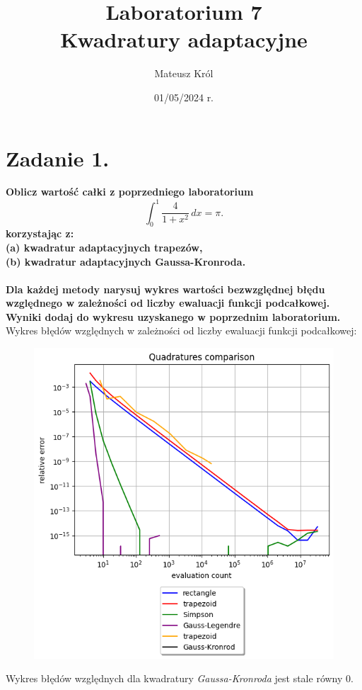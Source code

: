 \documentclass{article}
\title{%
Laboratorium 7\\
  \huge Kwadratury adaptacyjne}
\author{Mateusz Król}
\date{01/05/2024 r.}
\begin{document}
\maketitle

 
\section*{Zadanie 1.}
\textbf{Oblicz wartość całki z poprzedniego laboratorium
$$ \int_{0}^{1} \frac{4}{1+x^2} \,dx = \pi.$$
korzystając z:\\
(a) kwadratur adaptacyjnych trapezów,\\
(b) kwadratur adaptacyjnych Gaussa-Kronroda.\\\\
Dla każdej metody narysuj wykres wartości bezwzględnej błędu względnego w
zależności od liczby ewaluacji funkcji podcałkowej. Wyniki dodaj do wykresu
uzyskanego w poprzednim laboratorium.}
\newpage
Wykres błędów względnych w zależności od liczby ewaluacji
funkcji podcałkowej:
\begin{figure}[H]
  \includegraphics[width=\linewidth]{figures/quad_f.png}
\end{figure}
Wykres błędów względnych dla kwadratury \textit{Gaussa-Kronroda}
jest stale równy 0.
\\\\
\null\quad
\end{document}
